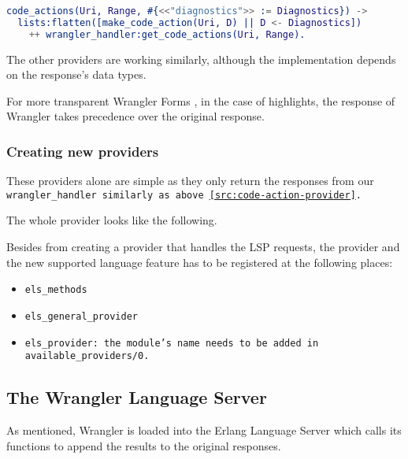 \begin{lstlisting}[language=erlang]
code_actions(Uri, Range, #{<<"diagnostics">> := Diagnostics}) ->
  lists:flatten([make_code_action(Uri, D) || D <- Diagnostics])
    ++ wrangler_handler:get_code_actions(Uri, Range).
\end{lstlisting}

The other providers are working similarly, although the implementation depends on the response's data types.

\begin{note}
For more transparent Wrangler Forms , in the case of highlights, the response of Wrangler takes precedence over the original response. 
\end{note}

\subsubsection{Creating new providers}

These providers alone are simple as they only return the responses from our \tt wrangler\_handler\rm\ similarly as above \ref{src:code-action-provider}.

The whole provider looks like the following.

Besides from creating a provider that handles the LSP requests, the provider and the new supported language feature has to be registered at the following places: 

\begin{itemize}
    \item \tt els\_methods\rm
    \item \tt els\_general\_provider\rm {}
    \item \tt els\_provider\rm : the module's name needs to be added in \tt available\_providers/0\rm . 
\end{itemize}


\subsection{The Wrangler Language Server}

As mentioned, Wrangler is loaded into the Erlang Language Server which calls its functions to append the results to the original responses. 

